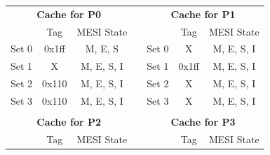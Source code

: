 \documentclass[12pt]{article}
\begin{document}
\begin{table}[H]
 	\centering
	\begin{tabular}{ccclccc}
		\cline{1-3} \cline{5-7}
		\multicolumn{3}{|c|}{\textbf{Cache for P0}}                                                & \multicolumn{1}{c|}{} & \multicolumn{3}{c|}{\textbf{Cache for P1}}                                                \\ \cline{1-3} \cline{5-7} 
		\multicolumn{1}{|c|}{}      & \multicolumn{1}{c|}{Tag}   & \multicolumn{1}{c|}{MESI State} & \multicolumn{1}{l|}{} & \multicolumn{1}{c|}{}      & \multicolumn{1}{c|}{Tag}   & \multicolumn{1}{c|}{MESI State} \\ \cline{1-3} \cline{5-7} 
		\multicolumn{1}{|c|}{Set 0} & \multicolumn{1}{c|}{0x1ff} & \multicolumn{1}{c|}{M, E, S}    & \multicolumn{1}{l|}{} & \multicolumn{1}{c|}{Set 0} & \multicolumn{1}{c|}{X}     & \multicolumn{1}{c|}{M, E, S, I} \\ \cline{1-3} \cline{5-7} 
		\multicolumn{1}{|c|}{Set 1} & \multicolumn{1}{c|}{X}     & \multicolumn{1}{c|}{M, E, S, I} & \multicolumn{1}{l|}{} & \multicolumn{1}{c|}{Set 1} & \multicolumn{1}{c|}{0x1ff} & \multicolumn{1}{c|}{M, E, S, I} \\ \cline{1-3} \cline{5-7} 
		\multicolumn{1}{|c|}{Set 2} & \multicolumn{1}{c|}{0x110} & \multicolumn{1}{c|}{M, E, S, I} & \multicolumn{1}{l|}{} & \multicolumn{1}{c|}{Set 2} & \multicolumn{1}{c|}{X}     & \multicolumn{1}{c|}{M, E, S, I} \\ \cline{1-3} \cline{5-7} 
		\multicolumn{1}{|c|}{Set 3} & \multicolumn{1}{c|}{0x110} & \multicolumn{1}{c|}{M, E, S, I} & \multicolumn{1}{l|}{} & \multicolumn{1}{c|}{Set 3} & \multicolumn{1}{c|}{X}     & \multicolumn{1}{c|}{M, E, S, I} \\ \cline{1-3} \cline{5-7} 
		\multicolumn{1}{l}{}        & \multicolumn{1}{l}{}       & \multicolumn{1}{l}{}            &                       & \multicolumn{1}{l}{}       & \multicolumn{1}{l}{}       & \multicolumn{1}{l}{}            \\ \cline{1-3} \cline{5-7} 
		\multicolumn{3}{|c|}{\textbf{Cache for P2}}                                                & \multicolumn{1}{c|}{} & \multicolumn{3}{c|}{\textbf{Cache for P3}}                                                \\ \cline{1-3} \cline{5-7} 
		\multicolumn{1}{|c|}{}      & \multicolumn{1}{c|}{Tag}   & \multicolumn{1}{c|}{MESI State} & \multicolumn{1}{l|}{} & \multicolumn{1}{c|}{}      & \multicolumn{1}{c|}{Tag}   & \multicolumn{1}{c|}{MESI State} \\ \cline{1-3} \cline{5-7} 

\end{tabular}
\end{table}
\end{document}
